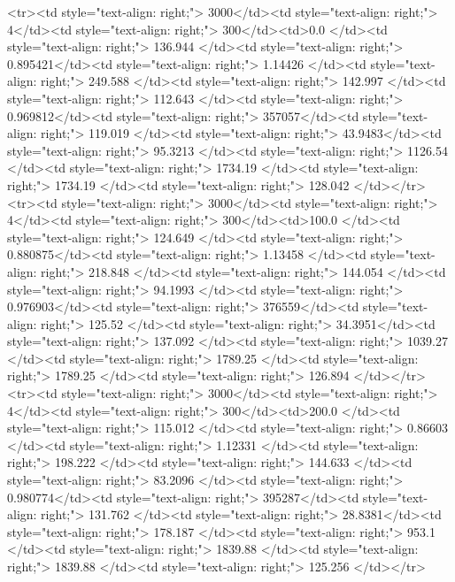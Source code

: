 <tr><td style="text-align: right;">      3000</td><td style="text-align: right;">         4</td><td style="text-align: right;">           300</td><td>0.0          </td><td style="text-align: right;">               136.944 </td><td style="text-align: right;">           0.895421</td><td style="text-align: right;">         1.14426 </td><td style="text-align: right;">        249.588 </td><td style="text-align: right;">           142.997 </td><td style="text-align: right;">             112.643   </td><td style="text-align: right;">             0.969812</td><td style="text-align: right;">              357057</td><td style="text-align: right;">                      119.019 </td><td style="text-align: right;">            43.9483</td><td style="text-align: right;">                95.3213 </td><td style="text-align: right;">      1126.54  </td><td style="text-align: right;">   1734.19 </td><td style="text-align: right;">      1734.19 </td><td style="text-align: right;">                128.042 </td></tr>
<tr><td style="text-align: right;">      3000</td><td style="text-align: right;">         4</td><td style="text-align: right;">           300</td><td>100.0        </td><td style="text-align: right;">               124.649 </td><td style="text-align: right;">           0.880875</td><td style="text-align: right;">         1.13458 </td><td style="text-align: right;">        218.848 </td><td style="text-align: right;">           144.054 </td><td style="text-align: right;">              94.1993  </td><td style="text-align: right;">             0.976903</td><td style="text-align: right;">              376559</td><td style="text-align: right;">                      125.52  </td><td style="text-align: right;">            34.3951</td><td style="text-align: right;">               137.092  </td><td style="text-align: right;">      1039.27  </td><td style="text-align: right;">   1789.25 </td><td style="text-align: right;">      1789.25 </td><td style="text-align: right;">                126.894 </td></tr>
<tr><td style="text-align: right;">      3000</td><td style="text-align: right;">         4</td><td style="text-align: right;">           300</td><td>200.0        </td><td style="text-align: right;">               115.012 </td><td style="text-align: right;">           0.86603 </td><td style="text-align: right;">         1.12331 </td><td style="text-align: right;">        198.222 </td><td style="text-align: right;">           144.633 </td><td style="text-align: right;">              83.2096  </td><td style="text-align: right;">             0.980774</td><td style="text-align: right;">              395287</td><td style="text-align: right;">                      131.762 </td><td style="text-align: right;">            28.8381</td><td style="text-align: right;">               178.187  </td><td style="text-align: right;">       953.1   </td><td style="text-align: right;">   1839.88 </td><td style="text-align: right;">      1839.88 </td><td style="text-align: right;">                125.256 </td></tr>

